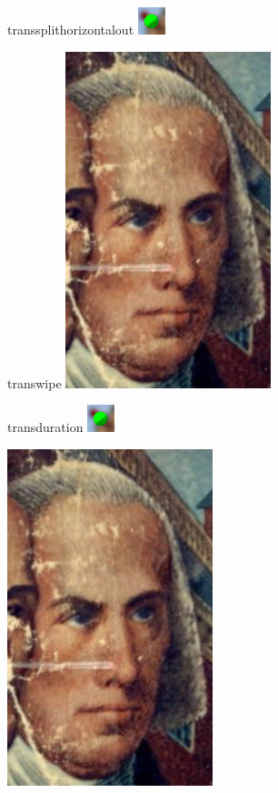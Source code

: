 \documentclass{beamer}
\begin{document}
\begin{frame}{transsplithorizontalout}
    \transsplithorizontalout
    \includegraphics{b.png}
\end{frame}

\begin{frame}{transwipe}
    \transwipe
    \includegraphics{a.png}
\end{frame}

\begin{frame}{transduration}
    \includegraphics{b.png}
\end{frame}

\begin{frame}
    \includegraphics{a.png}
\end{frame}

\begin{frame}
\end{frame}
\end{document}
